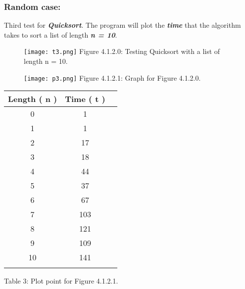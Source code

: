 {\bfseries\itshape\color{armygreen}{Observation:}} {\itshape{}} \hfill \break

\pagebreak

\subsubsection{Random case:}

Third test for {\bfseries\itshape Quicksort}. The program will plot the {\bfseries\itshape time} that the algorithm takes to sort a list of length {\linebreak\bfseries\itshape n = 10}. \hfill \break

\begin{figure}[H]
\texttt{[image: t3.png]}
\centering \linebreak \linebreak Figure 4.1.2.0: Testing Quicksort with a list of length n = 10.
\end{figure} \hfill 

\begin{multicols}{2}
\begin{figure}[H]
\texttt{[image: p3.png]}
\centering \linebreak \linebreak Figure 4.1.2.1: Graph for Figure 4.1.2.0.
\end{figure} \hfill

\begin{center}
\begin{tabular}[.5cm]{ c c c }
\toprule
Length ( n ) & Time ( t ) \\
\midrule
0 & 1 \\
\cmidrule {1-2}
1 & 1 \\
\cmidrule {1-2}
2 & 17 \\
\cmidrule {1-2}
3 & 18 \\
\cmidrule {1-2}
4 & 44 \\
\cmidrule {1-2}
5 & 37 \\
\cmidrule {1-2}
6 & 67 \\
\cmidrule {1-2}
7 & 103 \\
\cmidrule {1-2}
8 & 121 \\
\cmidrule {1-2}
9 & 109 \\
\cmidrule {1-2}
10 & 141 \\
\bottomrule
\linebreak
\end{tabular}
\linebreak \linebreak Table 3: Plot point for Figure 4.1.2.1.
\end{center}
\end{multicols}

